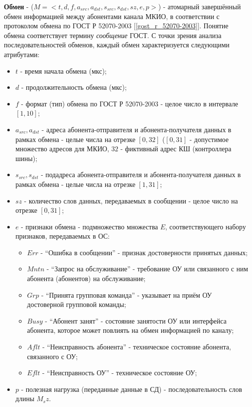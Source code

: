 
\textbf{Обмен} - ($M = <t, d, f, a_{src}, a_{dst}, s_{src}, s_{dst}, sz, e, p 
>$) - атомарный завершённый обмен информацией между абонентами канала МКИО, в 
соответствии с протоколом обмена по ГОСТ Р 52070-2003 
[\ref{gost_r_52070-2003}]. Понятие обмена соответствует термину 
\textit{сообщение} ГОСТ. С точки зрения анализа последовательностей обменов, 
каждый обмен характеризуется следующими атрибутами:

\begin{itemize}
 \item $t$ - время начала обмена (мкс);
 \item $d$ - продолжительность обмена (мкс);
 \item $f$ - формат (тип) обмена по ГОСТ Р 52070-2003 - целое число в интервале 
$[1, 10]$;
 \item $a_{src}, a_{dst}$ - адреса абонента-отправителя и абонента-получателя 
данных в рамках обмена - целые числа на отрезке $[0, 32]$ ($[0, 31]$ - 
допустимое множество адресов для МКИО, $32$ - фиктивный адрес КШ (контроллера 
шины);
 \item $s_{src}, s_{dst}$ - подадреса абонента-отправителя и 
абонента-получателя данных в рамках обмена - целые числа на отрезке $[1, 31]$;
 \item $sz$ - количество слов данных, передаваемых в сообщении - целое число на 
отрезке $[0, 31]$;
 \item $e$ - признаки обмена - подмножество множества $E$, 
соответствующего набору признаков, передаваемых в ОС:
 \begin{itemize}
  \item $Err$ - ``Ошибка в сообщении'' - признак достоверности принятых данных;
  \item $Mntn$ - ``Запрос на обслуживание'' - требование ОУ или связанного с 
ним абонента (абонентов) на обслуживание;
  \item $Grp$ - ``Принята групповая команда'' - указывает на приём ОУ 
достоверной групповой команды;
  \item $Busy$ - ``Абонент занят'' - состояние занятости ОУ или интерфейса 
абонента, которое может повлиять на обмен информацией по каналу;
  \item $Aflt$ - ``Неисправность абонента'' - техническое состояние абонента, 
связанного с ОУ;
  \item $Eflt$ - ``Неисправность ОУ'' - техническое состояние ОУ;
 \end{itemize}
 \item $p$ - полезная нагрузка (переданные данные в СД) - последовательность 
слов длины $M_sz$.
\end{itemize}

